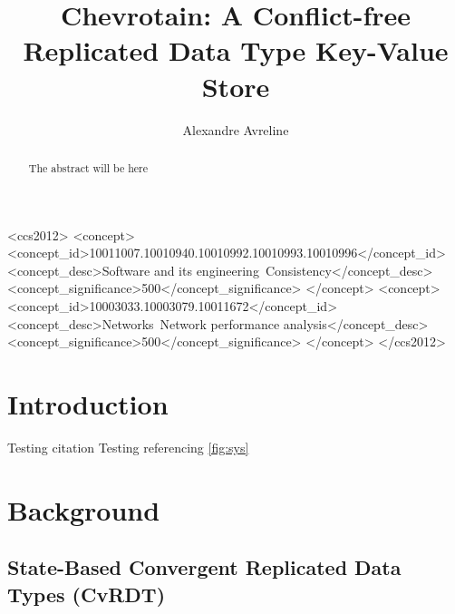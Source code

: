 \documentclass[sigconf,nonacm]{acmart}
\begin{document}
\title{Chevrotain: A Conflict-free Replicated Data Type Key-Value Store}

\author{Alexandre Avreline}


\begin{abstract}
The abstract will be here
\end{abstract}


\begin{CCSXML}
<ccs2012>
   <concept>
       <concept_id>10011007.10010940.10010992.10010993.10010996</concept_id>
       <concept_desc>Software and its engineering~Consistency</concept_desc>
       <concept_significance>500</concept_significance>
       </concept>
   <concept>
       <concept_id>10003033.10003079.10011672</concept_id>
       <concept_desc>Networks~Network performance analysis</concept_desc>
       <concept_significance>500</concept_significance>
       </concept>
 </ccs2012>
\end{CCSXML}




\maketitle

\section{Introduction}
Testing citation \cite{Davey:Lattices}
Testing referencing \ref{fig:sys}

\section{Background}

\subsection{State-Based Convergent Replicated Data Types (CvRDT)}
\end{document}
